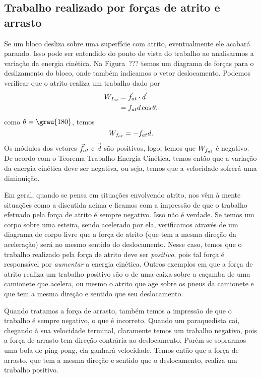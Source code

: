 \subsection{Trabalho realizado por forças de atrito e arrasto}

Se um bloco desliza sobre uma superfície com atrito, eventualmente ele acabará parando. Isso pode ser entendido do ponto de vista do trabalho ao analisarmos a variação da energia cinética. Na Figura~??? temos um diagrama de forças para o deslizamento do bloco, onde também indicamos o vetor deslocamento. Podemos verificar que o atrito realiza um trabalho dado por
\begin{align}
  W_{f_{at}} &= \vec{f}_{at}\cdot\vec{d} \\
  &= f_{at} d\cos\theta.
\end{align}
%
como $\theta = \grau{180}$, temos
\begin{equation}
  W_{f_{at}} = -f_{at} d.
\end{equation}
%
Os módulos dos vetores $\vec{f}_{at}$ e $\vec{d}$ são positivos, logo, temos que $W_{f_{at}}$ é negativo. De acordo com o Teorema Trabalho-Energia Cinética, temos então que a variação da energia cinética deve ser negativa, ou seja, temos que a velocidade sofrerá uma diminuição. 

Em geral, quando se pensa em situações envolvendo atrito, nos vêm à mente situações como a discutida acima e ficamos com a impressão de que o trabalho efetuado pela força de atrito é sempre negativo. Isso não é verdade. Se temos um corpo sobre uma esteira, %
sendo acelerado por ela, verificamos através de um diagrama de corpo livre %
que a força de atrito (que tem a mesma direção da aceleração) será no mesmo sentido do deslocamento. Nesse caso, temos que o trabalho realizado pela força de atrito deve ser \emph{positivo}, pois tal força é responsável por \emph{aumentar} a energia cinética. Outros exemplos em que a força de atrito realiza um trabalho positivo são o de uma caixa sobre a caçamba de uma camionete que acelera, ou mesmo o atrito que age sobre os pneus da camionete e que tem a mesma direção e sentido que seu deslocamento.

Quando tratamos a força de arrasto, também temos a impressão de que o trabalho é sempre negativo, o que é incorreto. Quando um paraquedista cai, chegando à sua velocidade terminal, claramente temos um trabalho negativo, pois a força de arrasto tem direção contrária ao deslocamento. Porém se soprarmos uma bola de ping-pong, ela ganhará velocidade. Temos então que a força de arrasto, que tem a mesma direção e sentido que o deslocamento, realiza um trabalho positivo.

